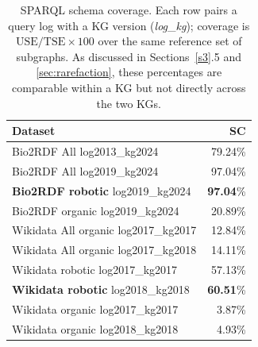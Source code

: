 \documentclass[sw]{iosart2x}
\providecommand{\DIFaddbeginFL}{} %
\providecommand{\DIFaddendFL}{} %
\providecommand{\DIFdelbeginFL}{} %
\providecommand{\DIFdelendFL}{} %
\providecommand{\DIFscaledelfig}{0.5}
\newlength{\DIFdelgraphicswidth} %
\newlength{\DIFdelgraphicsheight} %
\providecommand{\DIFaddincludegraphics}[2][]{{\color{blue}\fbox{\DIFOincludegraphics[#1]{#2}}}} %
\providecommand{\DIFdelincludegraphics}[2][]{%
\sbox{\DIFdelgraphicsbox}{\DIFOincludegraphics[#1]{#2}}%
\settoboxwidth{\DIFdelgraphicswidth}{\DIFdelgraphicsbox} %
\settoboxtotalheight{\DIFdelgraphicsheight}{\DIFdelgraphicsbox} %
\scalebox{\DIFscaledelfig}{%
\parbox[b]{\DIFdelgraphicswidth}{\usebox{\DIFdelgraphicsbox}\\[-\baselineskip] \rule{\DIFdelgraphicswidth}{0em}}\llap{\resizebox{\DIFdelgraphicswidth}{\DIFdelgraphicsheight}{%
\setlength{\unitlength}{\DIFdelgraphicswidth}%
\begin{picture}(1,1)%
\thicklines\linethickness{2pt} %
{\color[rgb]{1,0,0}\put(0,0){\framebox(1,1){}}}%
{\color[rgb]{1,0,0}\put(0,0){\line( 1,1){1}}}%
{\color[rgb]{1,0,0}\put(0,1){\line(1,-1){1}}}%
\end{picture}%
}\hspace*{3pt}}} %
} %
\DeclareRobustCommand{\DIFaddbeginFL}{\DIFOaddbeginFL \let\includegraphics\DIFaddincludegraphics} %
\DeclareRobustCommand{\DIFaddendFL}{\DIFOaddendFL \let\includegraphics\DIFOincludegraphics} %
\DeclareRobustCommand{\DIFdelbeginFL}{\DIFOdelbeginFL \let\includegraphics\DIFdelincludegraphics} %
\DeclareRobustCommand{\DIFdelendFL}{\DIFOaddendFL \let\includegraphics\DIFOincludegraphics} %
\begin{document}
\begin{table}[ht]
\centering
\caption{SPARQL schema coverage. Each row pairs a query log with a KG version (\emph{log}\_\emph{kg}); coverage is $\mathrm{USE}/\mathrm{TSE}\times100$ over the same reference set of subgraphs. As discussed in Sections~\ref{s3}.5 and \ref{sec:rarefaction}, these percentages are comparable within a KG but not directly across the two KGs.}
\label{tab:5}
\DIFdelbeginFL %
\DIFdelendFL \DIFaddbeginFL \begin{tabular}{l|r}
\hline
Dataset & SC \\
\hline
Bio2RDF All log2013\_kg2024 & 79.24\% \\
Bio2RDF All log2019\_kg2024 & 97.04\% \\
\textbf{Bio2RDF robotic }log2019\_kg2024 & \textbf{97.04}\%\\
Bio2RDF organic log2019\_kg2024 & 20.89\% \\
Wikidata All organic log2017\_kg2017 & 12.84\% \\
Wikidata All organic log2017\_kg2018 & 14.11\% \\
Wikidata robotic log2017\_kg2017 & 57.13\% \\
\textbf{Wikidata robotic} log2018\_kg2018 & \textbf{60.51}\% \\
Wikidata organic log2017\_kg2017 & 3.87\%  \\
Wikidata organic log2018\_kg2018 & 4.93\%  \\
\hline
\end{tabular}
\DIFaddendFL \end{table}
\end{document}

